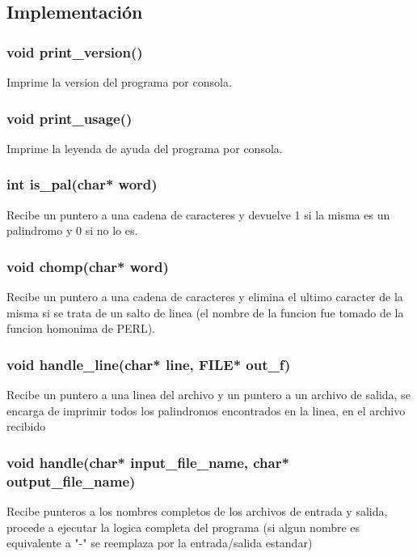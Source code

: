 \documentclass[10pt,a4paper]{article}
\begin{document}
\newpage

\subsection{Implementación}

\subsubsection{void print\_version()}

Imprime la version del programa por consola.

\subsubsection{void print\_usage()}

Imprime la leyenda de ayuda del programa por consola.

\subsubsection{int is\_pal(char* word)}

Recibe un puntero a una cadena de caracteres y devuelve 1 si la misma es un palindromo y 0 si no lo es.

\subsubsection{void chomp(char* word)}

Recibe un puntero a una cadena de caracteres y elimina el ultimo caracter de la misma si se trata de un salto de linea (el nombre de la funcion fue tomado de la funcion homonima de PERL).

\subsubsection{void handle\_line(char* line, FILE* out\_f)}

Recibe un puntero a una linea del archivo y un puntero a un archivo de salida, se encarga de imprimir todos los palindromos encontrados en la linea, en el archivo recibido

\subsubsection{void handle(char* input\_file\_name, char* output\_file\_name)}

Recibe punteros a los nombres completos de los archivos de entrada y salida, procede a ejecutar la logica completa del programa (si algun nombre es equivalente a "-" se reemplaza por la entrada/salida estandar)
\end{document}
